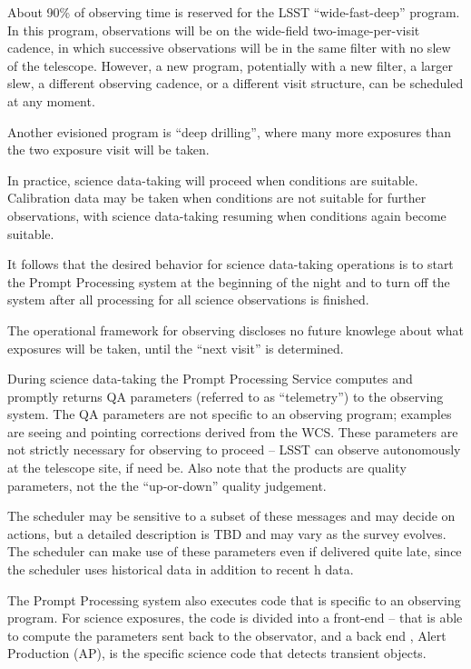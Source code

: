 About 90\% of observing time is reserved for the LSST “wide-fast-deep”
program. In this program, observations will be on the wide-field
two-image-per-visit cadence, in which successive observations will be
in the same filter with no slew of the telescope. However, a new
program, potentially with a new filter, a larger slew, a different
observing cadence, or a different visit structure, can be scheduled at
any moment.

Another evisioned program is ``deep drilling'', where many more exposures
than the two exposure visit will be taken.

In practice, science data-taking will proceed when conditions are
suitable. Calibration data may be taken when conditions are not
suitable for further observations, with science data-taking resuming
when conditions again become suitable.

It follows that the desired behavior for science data-taking
operations is to start the Prompt Processing system at the beginning
of the night and to turn off the system after all processing for all
science observations is finished.

The operational framework for observing discloses no future knowlege
about what exposures will be taken, until the “next visit” is
determined.

During science data-taking the Prompt Processing Service computes and
promptly returns QA parameters (referred to as “telemetry”) to the
observing system. The QA parameters are not specific to an observing
program; examples are seeing and pointing corrections derived from the
WCS. These parameters are not strictly necessary for observing to
proceed -- LSST can observe autonomously at the telescope site, if
need be. Also note that the products are quality parameters, not the
the “up-or-down” quality judgement.

The scheduler may be sensitive to a subset of these messages and may
decide on actions, but a detailed description is TBD and may vary as
the survey evolves. The scheduler can make use of these parameters even
if delivered quite late, since the scheduler uses historical data
in addition to recent h data.

The Prompt Processing system also executes code that is specific to an
observing program. For science exposures, the code is divided into
a front-end -- that is able to compute the parameters sent back  to the
observator, and a back end , Alert Production (AP), is the specific
science code that detects transient objects.


